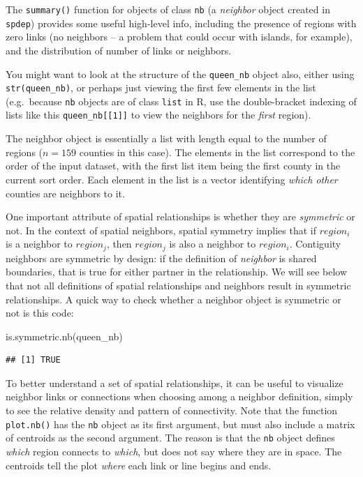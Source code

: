 \documentclass[
]{book}
\newenvironment{Shaded}{\begin{snugshade}}{\end{snugshade}}
\newcommand{\FunctionTok}[1]{\textcolor[rgb]{0.00,0.00,0.00}{#1}}
\newcommand{\NormalTok}[1]{#1}
\begin{document}
The \texttt{summary()} function for objects of class \texttt{nb} (a \emph{neighbor} object created in \texttt{spdep}) provides some useful high-level info, including the presence of regions with zero links (no neighbors -- a problem that could occur with islands, for example), and the distribution of number of links or neighbors.

You might want to look at the structure of the \texttt{queen\_nb} object also, either using \texttt{str(queen\_nb)}, or perhaps just viewing the first few elements in the list (e.g.~because \texttt{nb} objects are of class \texttt{list} in R, use the double-bracket indexing of lists like this \texttt{queen\_nb{[}{[}1{]}{]}} to view the neighbors for the \emph{first} region).

The neighbor object is essentially a list with length equal to the number of regions (\(n=159\) counties in this case). The elements in the list correspond to the order of the input dataset, with the first list item being the first county in the current sort order. Each element in the list is a vector identifying \emph{which other} counties are neighbors to it.

One important attribute of spatial relationships is whether they are \emph{symmetric} or not. In the context of spatial neighbors, spatial symmetry implies that if \(region_i\) is a neighbor to \(region_j\), then \(region_j\) is also a neighbor to \(region_i\). Contiguity neighbors are symmetric by design: if the definition of \emph{neighbor} is shared boundaries, that is true for either partner in the relationship. We will see below that not all definitions of spatial relationships and neighbors result in symmetric relationships. A quick way to check whether a neighbor object is symmetric or not is this code:

\begin{Shaded}
\begin{Highlighting}[]
\FunctionTok{is.symmetric.nb}\NormalTok{(queen\_nb)}
\end{Highlighting}
\end{Shaded}

\begin{verbatim}
## [1] TRUE
\end{verbatim}

To better understand a set of spatial relationships, it can be useful to visualize neighbor links or connections when choosing among a neighbor definition, simply to see the relative density and pattern of connectivity. Note that the function \texttt{plot.nb()} has the \texttt{nb} object as its first argument, but must also include a matrix of centroids as the second argument. The reason is that the \texttt{nb} object defines \emph{which} region connects to \emph{which}, but does not say where they are in space. The centroids tell the plot \emph{where} each link or line begins and ends.
\end{document}

